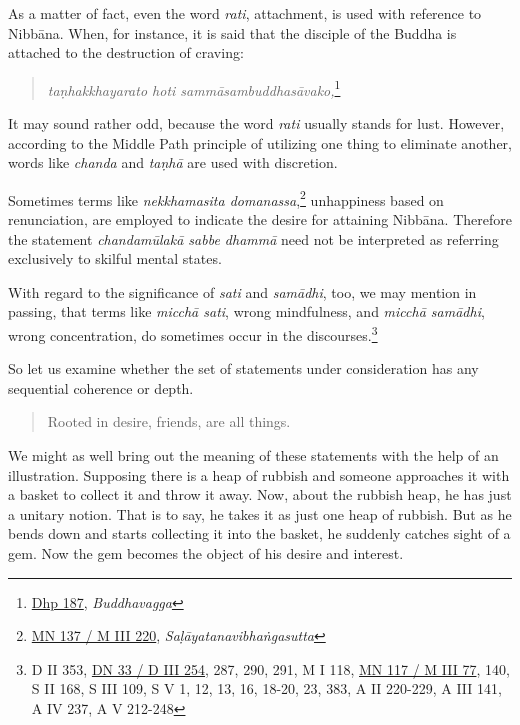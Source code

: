 As a matter of fact, even the word \emph{rati}, attachment, is used with reference to Nibbāna. When, for instance, it is said that the disciple of the Buddha is attached to the destruction of craving:

\begin{quote}
\emph{taṇhakkhayarato hoti sammāsambuddhasāvako,}\footnote{\href{https://suttacentral.net/dhp179-196/pli/ms}{Dhp 187}, \emph{Buddhavagga}}
\end{quote}

It may sound rather odd, because the word \emph{rati} usually stands for lust. However, according to the Middle Path principle of utilizing one thing to eliminate another, words like \emph{chanda} and \emph{taṇhā} are used with discretion.

Sometimes terms like \emph{nekkhamasita domanassa},\footnote{\href{https://suttacentral.net/mn137/pli/ms}{MN 137 / M III 220}, \emph{Saḷāyatanavibhaṅgasutta}} unhappiness based on renunciation, are employed to indicate the desire for attaining Nibbāna. Therefore the statement \emph{chandamūlakā sabbe dhammā} need not be interpreted as referring exclusively to skilful mental states.

With regard to the significance of \emph{sati} and \emph{samādhi}, too, we may mention in passing, that terms like \emph{micchā sati}, wrong mindfulness, and \emph{micchā samādhi}, wrong concentration, do sometimes occur in the discourses.\footnote{D II 353, \href{https://suttacentral.net/dn33/pli/ms}{DN 33 / D III 254}, 287, 290, 291, M I 118, \href{https://suttacentral.net/mn117/pli/ms}{MN 117 / M III 77}, 140, S II 168, S III 109, S V 1, 12, 13, 16, 18-20, 23, 383, A II 220-229, A III 141, A IV 237, A V 212-248}

So let us examine whether the set of statements under consideration has any sequential coherence or depth.

\begin{quote}
Rooted in desire, friends, are all things.
\end{quote}

We might as well bring out the meaning of these statements with the help of an illustration. Supposing there is a heap of rubbish and someone approaches it with a basket to collect it and throw it away. Now, about the rubbish heap, he has just a unitary notion. That is to say, he takes it as just one heap of rubbish. But as he bends down and starts collecting it into the basket, he suddenly catches sight of a gem. Now the gem becomes the object of his desire and interest.

